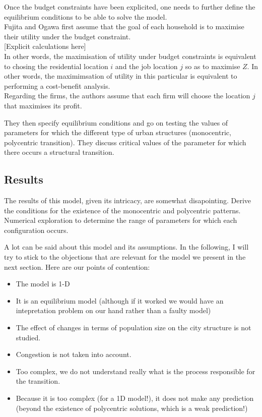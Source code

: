 Once the budget constraints have been explicited, one needs to further define
the equilibrium conditions to be able to solve the model.\\

Fujita and Ogawa first assume that the goal of each household is to maximise
their utility under the budget constraint.\\

[Explicit calculations here]\\

In other words, the maximisation of utility under budget constraints is
equivalent to chosing the residential location $i$ and the job location $j$ so
as to maximise $Z$. In other words, the maximimsation of utility in this
particular is equivalent to performing a cost-benefit analysis.\\

Regarding the firms, the authors assume that each firm will choose the location
$j$ that maximises its profit.

They then specify equilibrium conditions and go on testing the values of
parameters for which the different type of urban structures (monocentric,
polycentric transition). They discuss critical values of the parameter for which
there occurs a structural transition.


\subsection{Results}
\label{sub:results}

The results of this model, given its intricacy, are somewhat disapointing.
Derive the conditions for the existence of the monocentric and polycentric
patterns. Numerical exploration to determine the range of parameters for which
each configuration occurs.


A lot can be said about this model and its assumptions. In the following, I will
try to stick to the objections that are relevant for the model we present in the
next section.
Here are our points of contention:

\begin{itemize}
    \item The model is 1-D
    \item It is an equilibrium model (although if it worked we would have an
        intepretation problem on our hand rather than a faulty model)
    \item The effect of changes in terms of population size on the city
        structure is not studied.
    \item Congestion is not taken into account.
    \item Too complex, we do not understand really what is the process
        responsible for the transition.
    \item Because it is too complex (for a 1D model!), it does not make any
        prediction (beyond the existence of polycentric solutions, which is a
        weak prediction!)
\end{itemize}


